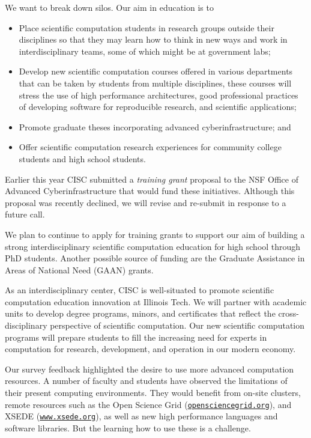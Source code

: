 \documentclass[12pt]{amsart}
\begin{document}
We want to break down silos.  Our aim in education is to
\begin{itemize}
    \item Place scientific computation students in research groups outside their disciplines so that they may learn how to think in new ways and work in interdisciplinary teams, some of which might be at government labs;
    
    \item Develop new scientific computation courses offered in various departments that can be taken by students from multiple disciplines, these courses will stress the use of high performance architectures, good professional practices of developing software for reproducible research, and scientific applications;
    
    \item Promote graduate theses incorporating advanced cyberinfrastructure; and
    
    \item Offer scientific computation research experiences for community college students and high school students.

\end{itemize}
Earlier this year CISC submitted a \emph{training grant} proposal to the NSF Office of Advanced Cyberinfrastructure that would fund these initiatives.  Although this proposal was recently declined, we will revise and re-submit in response to a future call.

We plan to continue to apply for training grants to support our aim of building a strong interdisciplinary scientific computation education for high school through PhD students.  Another possible source of funding are the Graduate Assistance in Areas of National Need (GAAN) grants. 

As an interdisciplinary center, CISC is well-situated to promote scientific computation education innovation at Illinois Tech.  We will partner with academic units to develop degree programs, minors, and certificates that reflect the cross-disciplinary perspective of scientific computation.  Our new scientific computation programs will prepare students to fill the increasing need for experts in computation for research, development, and operation in our modern economy.

Our survey feedback highlighted the desire to use more advanced computation resources.  A number of faculty and students have observed the limitations of their present computing environments.  They would benefit from on-site clusters, remote resources such as the Open Science Grid (\href{http://opensciencegrid.org}{\nolinkurl{opensciencegrid.org}}), and XSEDE (\href{https://www.xsede.org}{\nolinkurl{www.xsede.org}}), as well as new high performance languages and software libraries.  But the learning how to use these is a challenge.
\end{document}
